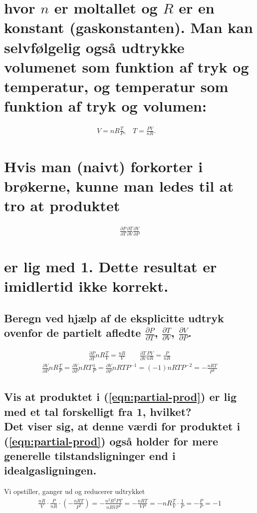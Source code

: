 \documentclass[11pt,a4paper]{article}
\begin{document}
\section*
{
    \mdseries hvor $n$ er moltallet og $R$ er en konstant (gaskonstanten). Man
    kan selvfølgelig også udtrykke volumenet som funktion af tryk og
    temperatur, og temperatur som funktion af tryk og volumen:
}
\begin{align}
    V = n R \frac{T}{P}\text{,} \quad
    T = \frac{PV}{nR}\text{.} \quad
\end{align}
\section*
{
    \mdseries Hvis man (naivt) forkorter i brøkerne, kunne man ledes til at
    tro at produktet
}
\begin{align}
    \frac{\partial P}{\partial T}
    \frac{\partial T}{\partial V}
    \frac{\partial V}{\partial P}
    \label{eqn:partial-prod}
\end{align}
\section*
{
    \mdseries er lig med 1. Dette resultat er imidlertid ikke korrekt.
}
\subsection
{
    \mdseries Beregn ved hjælp af de eksplicitte udtryk ovenfor de partielt
    afledte $\frac{\partial P}{\partial T}$, $\frac{\partial T}{\partial V}$,
    $\frac{\partial V}{\partial P}$.
}
\begin{align}
    \frac{\partial P}{\partial T} n R \frac{T}{V}
    = \frac{n R}{V}
    \qquad
    \frac{\partial T}{\partial V} \frac{P V}{n R}
    = \frac{P}{n R}
\end{align}
\begin{align}
    \frac{\partial V}{\partial P} n R \frac{T}{P}
    = \frac{\partial V}{\partial P} n R T \frac{1}{P}
    = \frac{\partial V}{\partial P} n R T P^{-1}
    = (-1)n R T P^{-2}
    = -\frac{n R T}{P^2}
\end{align}

\subsection
{
    \mdseries Vis at produktet i (\ref{eqn:partial-prod}) er lig med et tal
    forskelligt fra 1, hvilket?
    \\
    Det viser sig, at denne værdi for produktet i (\ref{eqn:partial-prod})
    også holder for mere generelle tilstandsligninger end i idealgasligningen.
}
Vi opstiller, ganger ud og reducerer udtrykket
\begin{align}
    \frac{n R}{V} \cdot \frac{P}{n R} \cdot \left( -\frac{n R T}{P^2} \right)
    = -\frac{n^2 R^2 P T}{n R V P^2}
    = -\frac{n R T}{V P}
    = -n R \frac{T}{V} \cdot \frac{1}{P}
    = - \frac{P}{P}
    = -1
\end{align}
\end{document}
